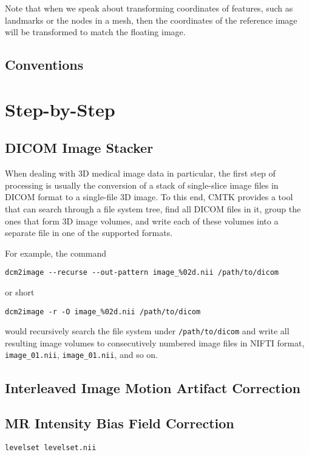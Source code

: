 \documentclass{InsightArticle}
\begin{document}
Note that when we speak about transforming coordinates of features, such as
landmarks or the nodes in a mesh, then the coordinates of the reference image
will be transformed to match the floating image.

\subsection{Conventions}

\section{Step-by-Step}

\subsection{DICOM Image Stacker}

When dealing with 3D medical image data in particular, the first step of
processing is usually the conversion of a stack of single-slice image files in
DICOM format to a single-file 3D image. To this end, CMTK provides a tool that
can search through a file system tree, find all DICOM files in it, group the
ones that form 3D image volumes, and write each of these volumes into a
separate file in one of the supported formats.

For example, the command
\begin{verbatim}
dcm2image --recurse --out-pattern image_%02d.nii /path/to/dicom
\end{verbatim}
or short
\begin{verbatim}
dcm2image -r -O image_%02d.nii /path/to/dicom
\end{verbatim}
would recursively search the file system under {\tt /path/to/dicom} and write
all resulting image volumes to consecutively numbered image files in NIFTI
format, {\tt image\_01.nii},  {\tt image\_01.nii}, and so on.

\subsection{Interleaved Image Motion Artifact Correction}

\subsection{MR Intensity Bias Field Correction}

\begin{verbatim}
levelset levelset.nii
\end{verbatim}
\end{document}
